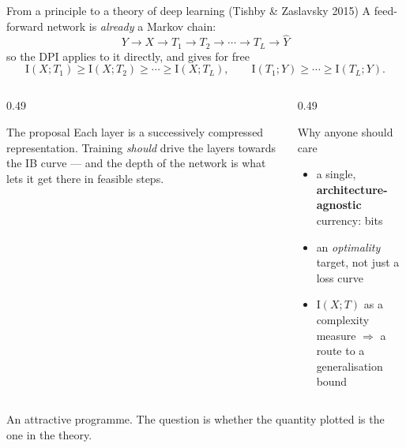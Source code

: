 \documentclass[aspectratio=169,11pt]{beamer}
\newcommand{\I}{\mathrm{I}}
\begin{document}
\begin{frame}{From a principle to a theory of deep learning (Tishby \& Zaslavsky 2015)}
\small
A feed-forward network is \emph{already} a Markov chain:
\[ Y \to X \to T_1 \to T_2 \to \cdots \to T_L \to \hat{Y} \]
so the DPI applies to it directly, and gives for free
\[ \I(X;T_1) \ge \I(X;T_2) \ge \cdots \ge \I(X;T_L),
\qquad \I(T_1;Y) \ge \cdots \ge \I(T_L;Y). \]
\smallskip
\begin{columns}[T]
\begin{column}{0.49\textwidth}
\begin{block}{The proposal}
Each layer is a successively compressed representation. Training \emph{should} drive
the layers towards the IB curve --- and the depth of the network is what lets it get
there in feasible steps.
\end{block}
\end{column}
\begin{column}{0.49\textwidth}
\begin{block}{Why anyone should care}
\begin{itemize}\small
  \item a single, \textbf{architecture-agnostic} currency: bits
  \item an \emph{optimality} target, not just a loss curve
  \item $\I(X;T)$ as a complexity measure $\Rightarrow$ a route to a
        generalisation bound
\end{itemize}
\end{block}
\end{column}
\end{columns}
\medskip
\centering\small
An attractive programme. The question is whether the quantity plotted is the one in the theory.
\end{frame}
\end{document}
